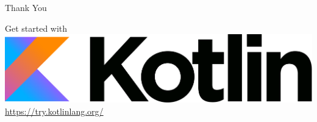 \begin{frame}{Thank You}
	\begin{center}
		\LARGE Get started with\\
		\vspace{.5cm}
		{\includegraphics[width=.75\paperwidth]{figures/kotlinLogo2}}\\
		\vspace{.5cm}
		\href{https://try.kotlinlang.org/}{https://try.kotlinlang.org/}
	\end{center}
\end{frame}